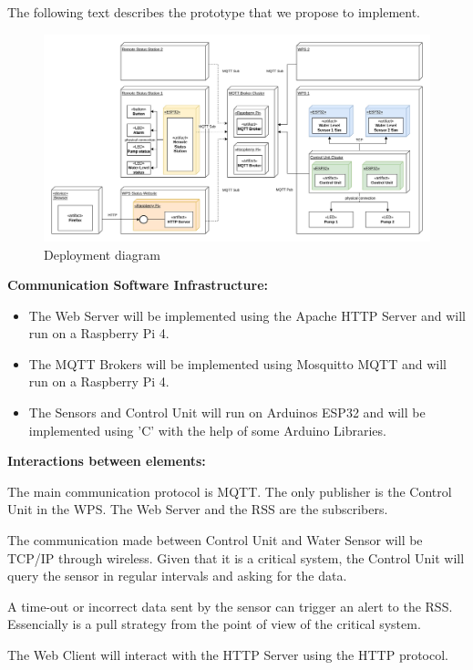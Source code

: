 \documentclass[11pt]{article}
\begin{document}
The following text describes the prototype that we propose to implement. 

\begin{figure}[H]
  \centering
  \includegraphics[width=\linewidth]{../diagrams/deployment-diagram-WPS.jpg}
  \caption{Deployment diagram}
  \label{fig:Deployment Diagram}
\end{figure}

\textbf{Communication Software Infrastructure:}

\begin{itemize}
	\item The Web Server will be implemented using the Apache HTTP Server and will run on a Raspberry Pi 4.
	\item The MQTT Brokers will be implemented using Mosquitto MQTT and will run on a Raspberry Pi 4.
	\item The Sensors and Control Unit will run on Arduinos ESP32 and will be implemented using 'C' with the help of some Arduino Libraries. 
\end{itemize}

\textbf{Interactions between elements:}

The main communication protocol is MQTT. The only publisher is the Control Unit in the WPS. The Web Server and the RSS are the subscribers.

The communication made between Control Unit and Water Sensor will be TCP/IP through wireless. Given that it is a critical system, the Control Unit will query the sensor in regular intervals and asking for the data.

A time-out or incorrect data sent by the sensor can trigger an alert to the RSS. Essencially is a pull strategy from the point of view of the critical system.

The Web Client will interact with the HTTP Server using the HTTP protocol.
\end{document}
